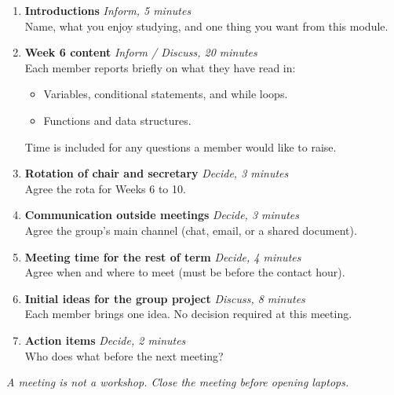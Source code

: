 \documentclass[a4paper,11pt]{article}
\begin{document}
\begin{enumerate}

  \item \textbf{Introductions} \hfill\textit{Inform, 5 minutes}\\
  Name, what you enjoy studying, and one thing you want from this module.

  \item \textbf{Week 6 content} \hfill\textit{Inform / Discuss, 20 minutes}\\
  Each member reports briefly on what they have read in:
  \begin{itemize}[leftmargin=1.4em,topsep=0.1em,itemsep=0pt]
    \item Variables, conditional statements, and while loops.
    \item Functions and data structures.
  \end{itemize}
  Time is included for any questions a member would like to raise.

  \item \textbf{Rotation of chair and secretary} \hfill\textit{Decide, 3 minutes}\\
  Agree the rota for Weeks 6 to 10.

  \item \textbf{Communication outside meetings} \hfill\textit{Decide, 3 minutes}\\
  Agree the group's main channel (chat, email, or a shared document).

  \item \textbf{Meeting time for the rest of term} \hfill\textit{Decide, 4 minutes}\\
  Agree when and where to meet (must be before the contact hour).

  \item \textbf{Initial ideas for the group project} \hfill\textit{Discuss, 8 minutes}\\
  Each member brings one idea. No decision required at this meeting.

  \item \textbf{Action items} \hfill\textit{Decide, 2 minutes}\\
  Who does what before the next meeting?

\end{enumerate}

\vspace{0.6em}

{\color{muted}\small\itshape
A meeting is not a workshop. Close the meeting before opening laptops.
}
\end{document}
